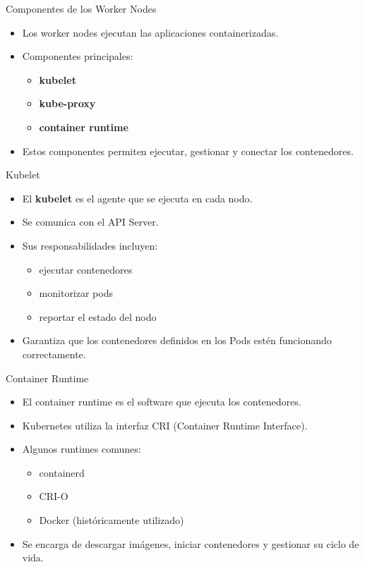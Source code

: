 \documentclass{beamer}
\begin{document}
\begin{frame}{Componentes de los Worker Nodes}
\begin{itemize}
\item Los worker nodes ejecutan las aplicaciones containerizadas.
\item Componentes principales:
\begin{itemize}
\item \textbf{kubelet}
\item \textbf{kube-proxy}
\item \textbf{container runtime}
\end{itemize}
\item Estos componentes permiten ejecutar, gestionar y conectar los contenedores.
\end{itemize}
\end{frame}

\begin{frame}{Kubelet}
\begin{itemize}
\item El \textbf{kubelet} es el agente que se ejecuta en cada nodo.
\item Se comunica con el API Server.
\item Sus responsabilidades incluyen:
\begin{itemize}
\item ejecutar contenedores
\item monitorizar pods
\item reportar el estado del nodo
\end{itemize}
\item Garantiza que los contenedores definidos en los Pods estén funcionando correctamente.
\end{itemize}
\end{frame}

\begin{frame}{Container Runtime}
\begin{itemize}
\item El container runtime es el software que ejecuta los contenedores.
\item Kubernetes utiliza la interfaz CRI (Container Runtime Interface).
\item Algunos runtimes comunes:
\begin{itemize}
\item containerd
\item CRI-O
\item Docker (históricamente utilizado)
\end{itemize}
\item Se encarga de descargar imágenes, iniciar contenedores y gestionar su ciclo de vida.
\end{itemize}
\end{frame}
\end{document}
